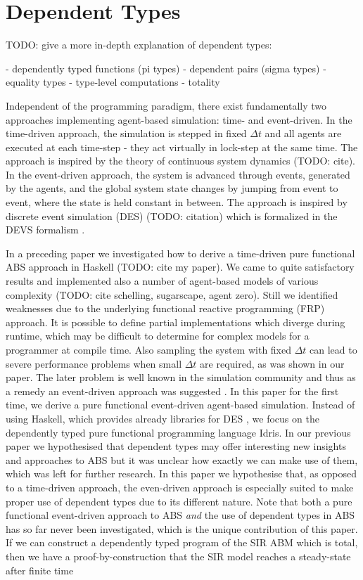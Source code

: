 \chapter{Dependent Types}
TODO: give a more in-depth explanation of dependent types:

- dependently typed functions (pi types)
- dependent pairs (sigma types)
- equality types
- type-level computations
- totality

Independent of the programming paradigm, there exist fundamentally two approaches implementing agent-based simulation: time- and event-driven. In the time-driven approach, the simulation is stepped in fixed $\Delta t$ and all agents are executed at each time-step - they act virtually in lock-step at the same time. The approach is inspired by the theory of continuous system dynamics (TODO: cite).
In the event-driven approach, the system is advanced through events, generated by the agents, and the global system state changes by jumping from event to event, where the state is held constant in between. The approach is inspired by discrete event simulation (DES) (TODO: citation) which is formalized in the DEVS formalism \cite{zeigler_theory_2000}.

In a preceding paper we investigated how to derive a time-driven pure functional ABS approach in Haskell (TODO: cite my paper). We came to quite satisfactory results and implemented also a number of agent-based models of various complexity (TODO: cite schelling, sugarscape, agent zero). Still we identified weaknesses due to the underlying functional reactive programming (FRP) approach. It is possible to define partial implementations which diverge during runtime, which may be difficult to determine for complex models for a programmer at compile time. Also sampling the system with fixed $\Delta t$ can lead to severe performance problems when small $\Delta t$ are required, as was shown in our paper. The later problem is well known in the simulation community and thus as a remedy an event-driven approach was suggested \cite{meyer_event-driven_2014}.
In this paper for the first time, we derive a pure functional event-driven agent-based simulation. Instead of using Haskell, which provides already libraries for DES \cite{sorokin_aivika_2015}, we focus on the dependently typed pure functional programming language Idris. In our previous paper we hypothesised that dependent types may offer interesting new insights and approaches to ABS but it was unclear how exactly we can make use of them, which was left for further research. In this paper we hypothesise that, as opposed to a time-driven approach, the even-driven approach is especially suited to make proper use of dependent types due to its different nature. Note that both a pure functional event-driven approach to ABS \textit{and} the use of dependent types in ABS has so far never been investigated, which is the unique contribution of this paper.
If we can construct a dependently typed program of the SIR ABM which is total, then we have a proof-by-construction that the SIR model reaches a steady-state after finite time

